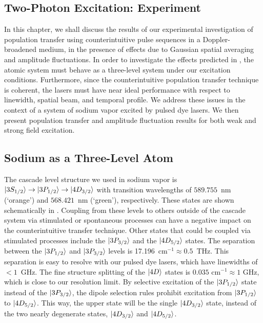 
\begin{singlespace}

\chapter{Two-Photon Excitation: Experiment}
\label{ciexpt}
\begpagestyle

\end{singlespace}

In this chapter, we shall discuss the results of our experimental investigation
of population transfer using counterintuitive pulse sequences in a
Doppler-broadened medium, in the presence of effects due to Gaussian spatial
averaging and amplitude fluctuations.  In order to investigate the effects
predicted in , the atomic system must behave as a three-level
system under our excitation conditions.  Furthermore, since the counterintuitive
population transfer technique is coherent, the lasers must have near ideal
performance with respect to linewidth, spatial beam, and temporal profile.  We
address these issues in the context of a system of sodium vapor excited by
pulsed dye lasers.  We then present population transfer and amplitude
fluctuation results for both weak and strong field excitation. 

\section{Sodium as a Three-Level Atom}

\hspace{\parindent}  The cascade level structure we used in sodium vapor is
$\vert 3S_{1/2} \rangle \rightarrow \vert 3P_{1/2} \rangle \rightarrow \vert 4D_{3/2} \rangle$ with
transition wavelengths of $589.755$~nm (`orange') and $568.421$~nm (`green'),
respectively.  These states are shown schematically in . 
Coupling from these levels to others outside of the cascade system via
stimulated or spontaneous processes can have a negative impact on the
counterintuitive transfer technique.  Other states that could be coupled via
stimulated processes include the $\vert 3P_{3/2} \rangle$ and the $\vert 4D_{5/2} \rangle$
states. The separation between the
$\vert 3P_{1/2} \rangle$ and $\vert 3P_{3/2} \rangle$ levels is 17.196~cm$^{-1}
\approx 0.5$~THz. This separation is easy to resolve with our pulsed
dye lasers, which have linewidths of $< 1$~GHz.  The fine structure
splitting of the $\vert 4D \rangle$ states is $0.035$ cm$^{-1} \approx 1$ GHz, which
is close to our resolution limit. By selective excitation of the
$\vert 3P_{1/2} \rangle$ state instead of the $\vert 3P_{3/2} \rangle$, the
dipole selection rules prohibit excitation from $\vert 3P_{1/2} \rangle$ to
$\vert 4D_{5/2} \rangle$.  This way, the upper state will be the single
$\vert 4D_{3/2} \rangle$ state, instead of the two nearly degenerate states,
$\vert 4D_{3/2} \rangle$ and $\vert 4D_{5/2} \rangle$.


